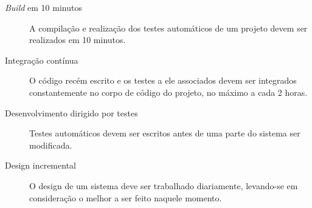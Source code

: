 \documentclass[a4paper,12pt,font=plain,header=plain]{abnt}
\begin{document}
\begin{description}
        \item[\textit{Build} em 10 minutos]
          A compilação e realização dos testes automáticos de um projeto devem ser realizados em 10 minutos.
        \item[Integração contínua]
          O código recém escrito e os testes a ele associados devem ser integrados constantemente no corpo de código do projeto, no máximo a cada 2 horas.
        \item[Desenvolvimento dirigido por testes]
          Testes automáticos devem ser escritos antes de uma parte do sistema ser modificada.
        \item[Design incremental]
          O design de um sistema deve ser trabalhado diariamente, levando-se em consideração o melhor a ser feito naquele momento.
      \end{description}


\end{document}
